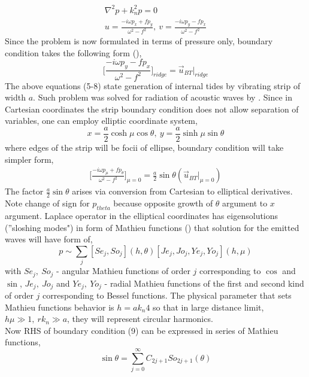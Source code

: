 \documentclass[12pt]{article}
\begin{document}
\begin{align}
\nabla^2 p + k_n^2 p = 0\\
u = \frac{-i \omega p_x + f p_y}{\omega^2 - f^2},~v = \frac{-i \omega p_y - f p_x}{\omega^2 - f^2}
\end{align}
Since the problem is now formulated in terms of pressure only, boundary condition takes the following form (\cite{greenspan1968theory}),
\begin{equation}
\Big[ \frac{-i \omega p_y - f p_x}{\omega^2 - f^2} \Big]_{ridge} = \vec{u}_{BT}|_{ridge}
\end{equation}
The above equations (5-8) state generation of internal tides by vibrating strip of width $a$. Such problem was solved for radiation of acoustic waves by \cite{morse1946methods}. Since in Cartesian coordinates the strip boundary condition does not allow separation of variables, one can employ elliptic coordinate system,
\begin{equation*}
x = \frac{a}{2} \cosh \mu \cos \theta,~y = \frac{a}{2} \sinh \mu \sin \theta
\end{equation*}
where edges of the strip will be focii of ellipse, boundary condition will take simpler form,
\begin{align}
\Big[ \frac{-i \omega p_{\mu} + f p_{\theta}}{\omega^2 - f^2} \Big]_{\mu = 0} = \frac{a}{2} \sin \theta (\vec{u}_{BT}|_{\mu = 0})
\end{align}
The factor $\frac{a}{2} \sin \theta$ arises via conversion from Cartesian to elliptical derivatives. Note change of sign for $p_{theta}$ because opposite growth of $\theta$ argument to $x$ argument. Laplace operator in the elliptical coordinates has eigensolutions (''sloshing modes") in form of Mathieu functions (\cite{stratton2007electromagnetic}) that solution for the emitted waves will have form of,
\begin{equation}
p \sim \sum_{j} [Se_j, So_j](h, \theta) [Je_j, Jo_j, Ye_j, Yo_j](h, \mu)
\end{equation}
with $Se_j,~So_j$ - angular Mathieu functions of order $j$ corresponding to $\cos$ and $\sin$, $Je_j,~Jo_j$ and $Ye_j,~Yo_j$ - radial Mathieu functions of the first and second kind of order $j$ corresponding to Bessel functions. The physical parameter that sets Mathieu functions behavior is $h = {a k_n}{4} $ so that in large distance limit, $h \mu \gg 1,~rk_n \gg a$, they will represent circular harmonics.\\
Now RHS of boundary condition (9) can be expressed in series of Mathieu functions,
\begin{equation}
\sin \theta = \sum_{j = 0}^{\infty} C_{2j + 1} So_{2j + 1} (\theta)
\end{equation}
\end{document}
